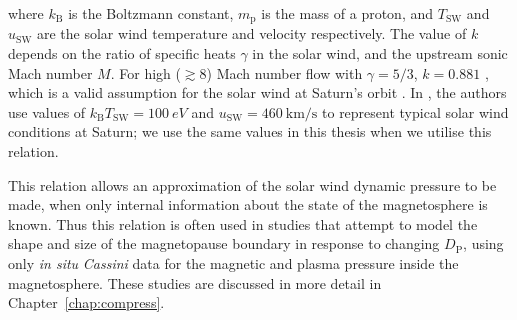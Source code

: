 where $k_\mathrm{B}$ is the Boltzmann constant, $m_\mathrm{p}$ is the mass of a proton, and $T_\mathrm{SW}$ and $u_\mathrm{SW}$ are the solar wind temperature and velocity respectively. The value of $k$ depends on the ratio of specific heats $\gamma$ in the solar wind, and the upstream sonic Mach number $M$. For high (${\gtrsim}8$) Mach number flow with $\gamma = 5/3$, $k = 0.881$ \citep{spreiter1966}, which is a valid assumption for the solar wind at Saturn's orbit \cite[e.g.][]{slavin1985,achilleos2006}. In \citet{pilkington2015}, the authors use values of $k_\mathrm{B}T_\mathrm{SW}=\SI{100}{eV}$ and $u_\mathrm{SW}=\SI{460}{\km\per\second}$ to represent typical solar wind conditions at Saturn; we use the same values in this thesis when we utilise this relation.

This relation allows an approximation of the solar wind dynamic pressure to be made, when only internal information about the state of the magnetosphere is known. Thus this relation is often used in studies that attempt to model the shape and size of the magnetopause boundary in response to changing $D_\mathrm{P}$, using only \textit{in situ} \textit{Cassini} data for the magnetic and plasma pressure inside the magnetosphere. These studies are discussed in more detail in Chapter~\ref{chap:compress}.


